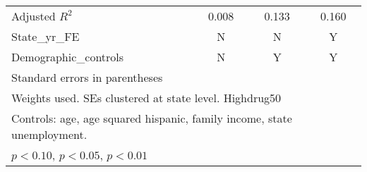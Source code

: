 \begin{table}[htbp]
\begin{tabular}{l*{3}{c}}
Adjusted \(R^{2}\)  &       0.008         &       0.133         &       0.160         \\
State\_yr\_FE         &           N         &           N         &           Y         \\
Demographic\_controls&           N         &           Y         &           Y         \\
\hline\hline
\multicolumn{4}{l}{\footnotesize Standard errors in parentheses}\\
\multicolumn{4}{l}{\footnotesize Weights used. SEs clustered at state level. Highdrug50}\\
\multicolumn{4}{l}{\footnotesize Controls: age, age squared hispanic, family income, state unemployment.}\\
\multicolumn{4}{l}{\footnotesize \sym{*} \(p<0.10\), \sym{**} \(p<0.05\), \sym{***} \(p<0.01\)}\\
\end{tabular}
\end{table}
